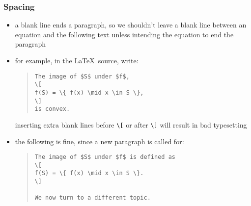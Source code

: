 \documentclass[usepdftitle=false]{beamer}
\begin{document}
\begin{frame}[fragile]
    \frametitle{Spacing}

    \begin{itemize}\itemsep=10pt
        \item a blank line ends a paragraph, so we shouldn't leave a blank line between an equation and the following text unless intending the equation to end the paragraph
        \item for example, in the \LaTeX\ source, write:
            \begin{quote}
                \begin{verbatim}
The image of $S$ under $f$,
\[
f(S) = \{ f(x) \mid x \in S \},
\]
is convex.
                \end{verbatim}
            \end{quote}\vspace*{-\baselineskip}
            inserting extra blank lines before \verb+\[+ or after \verb+\]+ will result in bad typesetting
        \item the following is fine, since a new paragraph is called for:
            \begin{quote}
                \begin{verbatim}
The image of $S$ under $f$ is defined as
\[
f(S) = \{ f(x) \mid x \in S \}.
\]

We now turn to a different topic.
                \end{verbatim}
            \end{quote}
    \end{itemize}
\end{frame}
\end{document}
